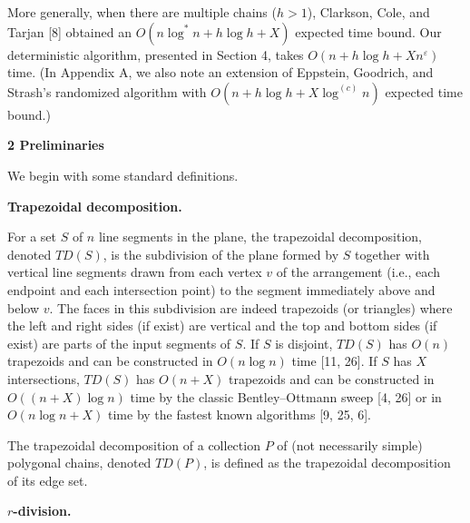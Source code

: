 \documentclass[10pt,a4paper]{article}
\begin{document}
\par
\par
More generally, when there are multiple chains ($h>1$), Clarkson, Cole, and Tarjan [8] obtained an $O(n\log^{*}n+h\log h+X)$ expected time bound. Our deterministic algorithm, presented in Section 4, takes $O(n+h\log h+Xn^{\varepsilon})$ time. (In Appendix A, we also note an extension of Eppstein, Goodrich, and Strash’s randomized algorithm with $O(n+h\log h+X\log^{(c)}n)$ expected time bound.)
\par
\par
\par\medskip\noindent\textbf{2 Preliminaries}\par
We begin with some standard definitions.
\par
\par
\par\medskip\noindent\textbf{Trapezoidal decomposition.}\par
For a set $S$ of $n$ line segments in the plane, the trapezoidal decomposition, denoted $\textit{TD}(S)$, is the subdivision of the plane formed by $S$ together with vertical line segments drawn from each vertex $v$ of the arrangement (i.e., each endpoint and each intersection point) to the segment immediately above and below $v$. The faces in this subdivision are indeed trapezoids (or triangles) where the left and right sides (if exist) are vertical and the top and bottom sides (if exist) are parts of the input segments of $S$. If $S$ is disjoint, $\textit{TD}(S)$ has $O(n)$ trapezoids and can be constructed in $O(n\log n)$ time [11, 26]. If $S$ has $X$ intersections, $\textit{TD}(S)$ has $O(n+X)$ trapezoids and can be constructed in $O((n+X)\log n)$ time by the classic Bentley–Ottmann sweep [4, 26] or in $O(n\log n+X)$ time by the fastest known algorithms [9, 25, 6].
\par
\par
The trapezoidal decomposition of a collection $P$ of (not necessarily simple) polygonal chains, denoted $\textit{TD}(P)$, is defined as the trapezoidal decomposition of its edge set.
\par
\par
\par\medskip\noindent\textbf{$r$-division.}\par
\end{document}
